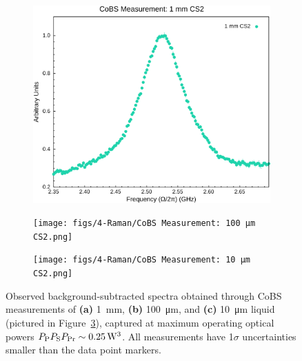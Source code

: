 \begin{figure}[h!]
  \centering
  \begin{subfigure}[b]{0.48\textwidth}
    \centering
    \includegraphics[width=\textwidth]{figs/4-Raman/CoBS Measurement: 1 mm CS2.png}
    \caption{}
    \label{fig:Raman:1mmCS2}
  \end{subfigure}
  \hfill
  \begin{subfigure}[b]{0.48\textwidth}
    \centering
    \texttt{[image: figs/4-Raman/CoBS Measurement: 100 μm CS2.png]}
    \caption{}
    \label{fig:Raman:100umCS2}
  \end{subfigure}
  \vspace{1em}
  \begin{subfigure}[b]{0.48\textwidth}
    \centering
    \texttt{[image: figs/4-Raman/CoBS Measurement: 10 μm CS2.png]}
    \caption{}
    \label{fig:Raman:10umCS2}
  \end{subfigure}
  \caption[Observed background-subtracted spectra from \SI{1}{\milli\meter}, \SI{100}{\micro\meter}, and \SI{10}{\micro\meter} liquid .]{Observed background-subtracted spectra obtained through \ac{CoBS} measurements of \textbf{(a)} \SI{1}{\milli\meter}, \textbf{(b)} \SI{100}{\micro\meter}, and \textbf{(c)} \SI{10}{\micro\meter} liquid  (pictured in Figure~\ref{fig:Raman:10umCS2}), captured at maximum operating optical powers \(P_{\rm P}P_{\rm S}P_{\rm Pr} \sim \SI{0.25}{\cubic\watt}\). All measurements have 1\(\sigma\) uncertainties smaller than the data point markers.}
  \label{fig:Raman:CS2combined}
\end{figure}

